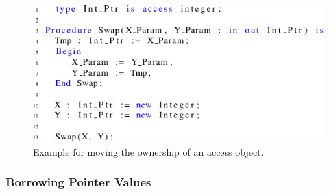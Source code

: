 \documentclass{llncs}
\begin{document}
\begin{figure}[htb!]
\centering
   \includegraphics[]{move_ex1}
   \caption{Example for moving the ownership of an access object.}
   \label{fig:move_ex1}
\end{figure}
 

\subsubsection{Borrowing Pointer Values}
\label{sec:borrowing}
\end{document}
